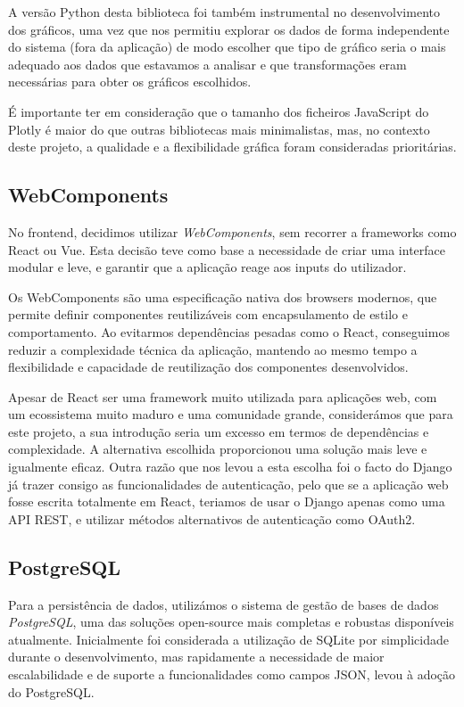 A versão Python desta biblioteca foi também instrumental no desenvolvimento dos gráficos, uma vez que nos permitiu explorar os dados de forma independente do sistema (fora da aplicação) de modo escolher que tipo de gráfico seria o mais adequado aos dados que estavamos a analisar e que transformações eram necessárias para obter os gráficos escolhidos. 

É importante ter em consideração que o tamanho dos ficheiros JavaScript do Plotly é maior do que outras bibliotecas mais minimalistas, mas, no contexto deste projeto, a qualidade e a flexibilidade gráfica foram consideradas prioritárias.

\subsection{WebComponents}

No frontend, decidimos utilizar \textit{WebComponents}, sem recorrer a frameworks como React ou Vue. Esta decisão teve como base a necessidade de criar uma interface modular e leve, e garantir que a aplicação reage aos inputs do utilizador.

Os WebComponents são uma especificação nativa dos browsers modernos, que permite definir componentes reutilizáveis com encapsulamento de estilo e comportamento. Ao evitarmos dependências pesadas como o React, conseguimos reduzir a complexidade técnica da aplicação, mantendo ao mesmo tempo a flexibilidade e capacidade de reutilização dos componentes desenvolvidos.

Apesar de React ser uma framework muito utilizada para aplicações web,  com um ecossistema muito maduro e uma comunidade grande, considerámos que para este projeto, a sua introdução seria um excesso em termos de dependências e complexidade. A alternativa escolhida proporcionou uma solução mais leve e igualmente eficaz. Outra razão que nos levou a esta escolha foi o facto do Django já trazer consigo as funcionalidades de autenticação, pelo que se a aplicação web fosse escrita totalmente em React, teriamos de usar o Django apenas como uma API REST, e utilizar métodos alternativos de autenticação como OAuth2.

\subsection{PostgreSQL}

Para a persistência de dados, utilizámos o sistema de gestão de bases de dados \textit{PostgreSQL}, uma das soluções open-source mais completas e robustas disponíveis atualmente. Inicialmente foi considerada a utilização de SQLite por simplicidade durante o desenvolvimento, mas rapidamente a necessidade de maior escalabilidade e de suporte a funcionalidades como campos JSON, levou à adoção do PostgreSQL.


